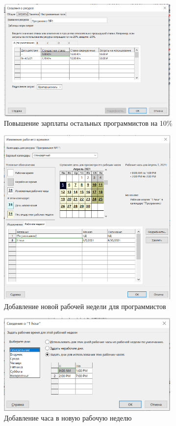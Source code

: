 \begin{figure}[H]
    \centering
    \includegraphics[width=0.8\textwidth]{img/content/2_2.png}
    \caption{Повышение зарплаты остальных программистов на 10\%}
    \label{fig:2_2}
\end{figure}

\begin{figure}[H]
    \centering
    \includegraphics[width=0.8\textwidth]{img/content/2_3.png}
    \caption{Добавление новой рабочей недели для программистов}
    \label{fig:2_3}
\end{figure}

\begin{figure}[H]
    \centering
    \includegraphics[width=0.8\textwidth]{img/content/2_4.png}
    \caption{Добавление часа в новую рабочую неделю}
    \label{fig:2_4}
\end{figure}

